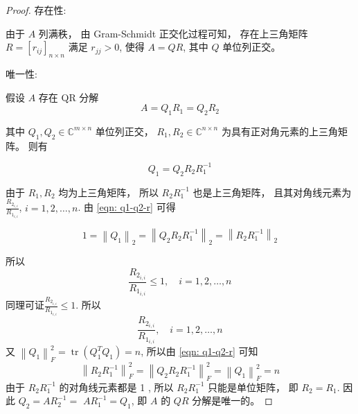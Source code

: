 \begin{proof}
    存在性: 
    
    由于 $A$ 列满秩， 由 Gram-Schmidt 正交化过程可知， 存在上三角矩阵 $R=\left[r_{i j}\right]_{n \times n}$ 满足 $r_{j j}>0$, 使得 $A=Q R$, 其中 $Q$ 单位列正交。

    唯一性: 
    
    假设 $A$ 存在 QR 分解
\begin{equation}
A=Q_{1} R_{1}=Q_{2} R_{2}
\end{equation}

其中 $Q_{1}, Q_{2} \in \mathbb{C}^{m \times n}$ 单位列正交， $R_{1}, R_{2} \in \mathbb{C}^{n \times n}$ 为具有正对角元素的上三角矩阵。 则有

\begin{equation}
    \label{eqn: q1-q2-r}
    Q_{1}=Q_{2} R_{2} R_{1}^{-1}
\end{equation}


由于 $R_{1}, R_{2}$ 均为上三角矩阵， 所以 $R_{2} R_{1}^{-1}$ 也是上三角矩阵， 且其对角线元素为 $\frac{R_{2_{i,i}}}{R_{1_{i,i}}}$, $i=1,2, \ldots, n$. 由 \cref{eqn: q1-q2-r} 可得

\begin{equation}
1=\left\|Q_{1}\right\|_{2}=\left\|Q_{2} R_{2} R_{1}^{-1}\right\|_{2}=\left\|R_{2} R_{1}^{-1}\right\|_{2}
\end{equation}

所以
\begin{equation}
\frac{R_{2_{i,i}}}{R_{1_{i,i}}} \leq 1, \quad i=1,2, \ldots, n
\end{equation}
同理可证$\frac{R_{2_{i,i}}}{R_{1_{i,i}}} \leq 1$. 所以
\begin{equation}
\frac{R_{2_{i,i}}}{R_{1_{i,i}}}, \quad i=1,2, \ldots, n
\end{equation}
又 $\left\|Q_{1}\right\|_{F}^{2}=\operatorname{tr}\left(Q_{1}^{T} Q_{1}\right)=n$, 所以由 \cref{eqn: q1-q2-r} 可知
\begin{equation}
\left\|R_{2} R_{1}^{-1}\right\|_{F}^{2}=\left\|Q_{2} R_{2} R_{1}^{-1}\right\|_{F}^{2}=\left\|Q_{1}\right\|_{F}^{2}=n
\end{equation}
由于 $R_{2} R_{1}^{-1}$ 的对角线元素都是 1 , 所以 $R_{2} R_{1}^{-1}$ 只能是单位矩阵， 即 $R_{2}=R_{1}$. 因此 $Q_{2}=A R_{2}^{-1}=$ $A R_{1}^{-1}=Q_{1}$, 即 $A$ 的 $ {QR}$ 分解是唯一的。

\end{proof}


